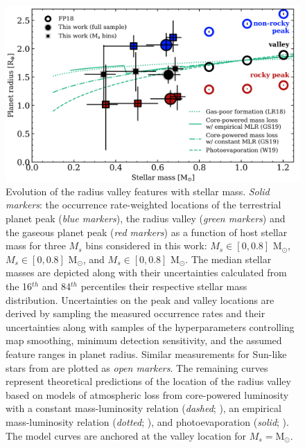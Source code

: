 \documentclass[twocolumn]{emulateapj}
\begin{document}
\begin{figure}
  \centering
  \includegraphics[width=0.85\hsize]{figures/rpvMsFULL_KepK2.png}
  \caption{Evolution of the radius valley features with stellar mass. \emph{Solid markers}:
    the occurrence rate-weighted locations of the terrestrial planet peak (\emph{blue markers}), the
    radius valley (\emph{green markers}) and the gaseous planet peak (\emph{red markers})
    as a function of host stellar mass for three $M_s$ bins considered in
    this work: $M_s \in [0,0.8]$ M$_{\odot}$, $M_s \in [0,0.8]$ M$_{\odot}$, and $M_s \in [0,0.8]$ M$_{\odot}$. The median stellar masses
    are depicted along with their uncertainties calculated from the 16$^{th}$ and 84$^{th}$ percentiles their respective stellar
    mass distribution. Uncertainties on the
    peak and valley locations are derived by sampling the measured occurrence rates and their uncertainties along
    with samples of the hyperparameters controlling map smoothing, minimum detection sensitivity, and the assumed feature ranges in
    planet radius. Similar measurements for Sun-like stars from \cite{fulton18} are plotted as \emph{open markers}. The remaining
    curves represent theoretical predictions of the location of the radius valley based on models of atmospheric loss from
    core-powered luminosity with a constant mass-luminosity relation (\emph{dashed}; \citealt{gupta19b}), an empirical mass-luminosity
    relation (\emph{dotted}; \citealt{gupta19b}), and photoevaporation (\emph{solid}; \citealt{wu19}).
    The model curves are anchored at the valley location for $M_s = \text{M}_{\odot}$.}
  \label{fig:rpvMs}
\end{figure}
\end{document}
